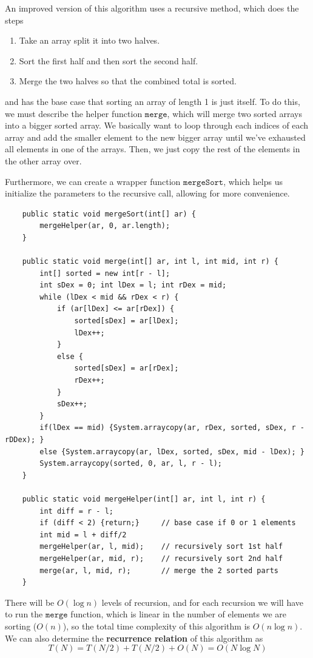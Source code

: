 \documentclass{article}
\begin{document}
    \begin{definition}
    An improved version of this algorithm uses a recursive method, which does the steps
    \begin{enumerate}
        \item Take an array split it into two halves. 
        \item Sort the first half and then sort the second half. 
        \item Merge the two halves so that the combined total is sorted. 
    \end{enumerate}
    and has the base case that sorting an array of length 1 is just itself. To do this, we must describe the helper function $\texttt{merge}$, which will merge two sorted arrays into a bigger sorted array. We basically want to loop through each indices of each array and add the smaller element to the new bigger array until we've exhausted all elements in one of the arrays. Then, we just copy the rest of the elements in the other array over. 

    Furthermore, we can create a wrapper function $\texttt{mergeSort}$, which helps us initialize the parameters to the recursive call, allowing for more convenience. 
    \begin{lstlisting}
    public static void mergeSort(int[] ar) {
        mergeHelper(ar, 0, ar.length); 
    }

    public static void merge(int[] ar, int l, int mid, int r) {
        int[] sorted = new int[r - l]; 
        int sDex = 0; int lDex = l; int rDex = mid; 
        while (lDex < mid && rDex < r) {
            if (ar[lDex] <= ar[rDex]) {
                sorted[sDex] = ar[lDex]; 
                lDex++; 
            }
            else {
                sorted[sDex] = ar[rDex]; 
                rDex++; 
            }
            sDex++; 
        }
        if(lDex == mid) {System.arraycopy(ar, rDex, sorted, sDex, r - rDDex); }
        else {System.arraycopy(ar, lDex, sorted, sDex, mid - lDex); }
        System.arraycopy(sorted, 0, ar, l, r - l); 
    }

    public static void mergeHelper(int[] ar, int l, int r) {
        int diff = r - l; 
        if (diff < 2) {return;}     // base case if 0 or 1 elements 
        int mid = l + diff/2 
        mergeHelper(ar, l, mid);    // recursively sort 1st half 
        mergeHelper(ar, mid, r);    // recursively sort 2nd half 
        merge(ar, l, mid, r);       // merge the 2 sorted parts 
    }
    \end{lstlisting}
    There will be $O(\log{n})$ levels of recursion, and for each recursion we will have to run the $\texttt{merge}$ function, which is linear in the number of elements we are sorting ($O(n)$), so the total time complexity of this algorithm is $O(n \log{n})$. We can also determine the \textbf{recurrence relation} of this algorithm as
    \[T(N) = T(N/2) + T(N/2) + O(N) = O(N \log{N})\]
    \end{definition}
\end{document}

